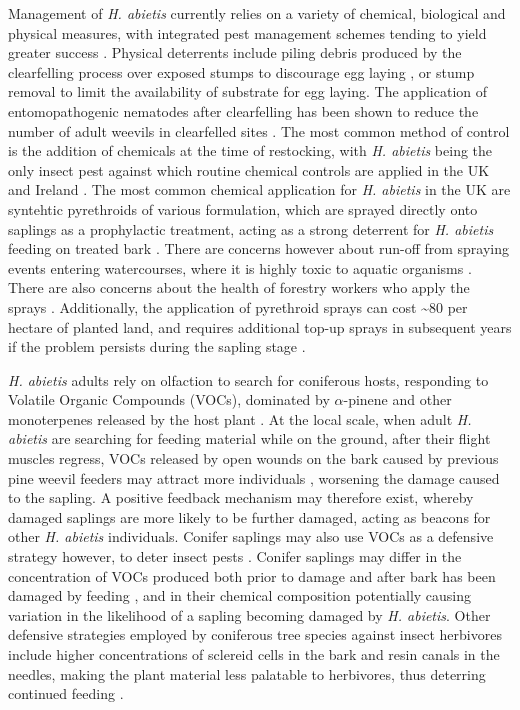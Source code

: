 \documentclass[a4paper, 11pt]{article}
\begin{document}
Management of \textit{H. abietis} currently relies on a variety of chemical, biological and physical measures, with integrated pest management schemes tending to yield greater success \citep{Willoughby2004}. Physical deterrents include piling debris produced by the clearfelling process over exposed stumps to discourage egg laying \citep{Rahman2015}, or stump removal to limit the availability of substrate for egg laying. The application of entomopathogenic nematodes after clearfelling has been shown to reduce the number of adult weevils in clearfelled sites \citep{Dillon2006, Kapranas2017, Williams2013}. The most common method of control is the addition of chemicals at the time of restocking, with \textit{H. abietis} being the only insect pest against which routine chemical controls are applied in the UK and Ireland \citep{Willoughby2004, Willoughby2017}. The most common chemical application for \textit{H. abietis} in the UK are syntehtic pyrethroids of various formulation, which are sprayed directly onto saplings as a prophylactic treatment, acting as a strong deterrent for \textit{H. abietis} feeding on treated bark \citep{Rose2005}. There are concerns however about run-off from spraying events entering watercourses, where it is highly toxic to aquatic organisms \citep{Willoughby2017, Mian1992, Antwi2015}. There are also concerns about the health of forestry workers who apply the sprays \citep{Rose2002}. Additionally, the application of pyrethroid sprays can cost \textasciitilde{}\textsterling{}80 per hectare of planted land, and requires additional top-up sprays in subsequent years if the problem persists during the sapling stage \citep{Willoughby2017}.  

\textit{H. abietis} adults rely on olfaction to search for coniferous hosts, responding to Volatile Organic Compounds (VOCs), dominated by $\alpha$-pinene and other monoterpenes released by the host plant \citep{Nordlander1986, Nordlander1987}. At the local scale, when adult \textit{H. abietis} are searching for feeding material while on the ground, after their flight muscles regress, VOCs released by open wounds on the bark caused by previous pine weevil feeders may attract more individuals \citep{Nordlander1987, Tilles1986}, worsening the damage caused to the sapling. A positive feedback mechanism may therefore exist, whereby damaged saplings are more likely to be further damaged, acting as beacons for other \textit{H. abietis} individuals. Conifer saplings may also use VOCs as a defensive strategy however, to deter insect pests \citep{Gershenzon1991, Trapp2001}. Conifer saplings may differ in the concentration of VOCs produced both prior to damage and after bark has been damaged by feeding \citep{Kivimaenpaa2012, Keeling2006}, and in their chemical composition \citep{Heijari2011} potentially causing variation in the likelihood of a sapling becoming damaged by \textit{H. abietis}. Other defensive strategies employed by coniferous tree species against insect herbivores include higher concentrations of sclereid cells in the bark and resin canals in the needles, making the plant material less palatable to herbivores, thus deterring continued feeding \citep{Donnelly2016, King2011}.
\end{document}
